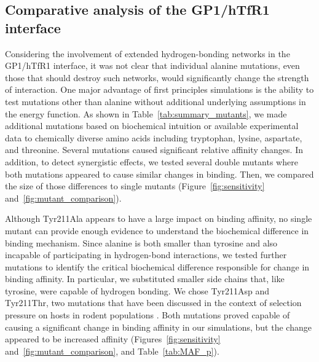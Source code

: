 \documentclass[12pt]{article}
\begin{document}
\subsection{Comparative analysis of the GP1/hTfR1 interface}
Considering the involvement of extended hydrogen-bonding networks in the GP1/hTfR1 interface, it was not clear that individual alanine mutations, even those that should destroy such networks, would significantly change the strength of interaction. One major advantage of first principles simulations is the ability to test mutations other than alanine without additional underlying assumptions in the energy function. As shown in Table~\ref{tab:summary_mutants}, we made additional mutations based on biochemical intuition or available experimental data to chemically diverse amino acids including tryptophan, lysine, aspartate, and threonine. Several mutations caused significant relative affinity changes. In addition, to detect synergistic effects, we tested several double mutants where both mutations appeared to cause similar changes in binding. Then, we compared the size of those differences to single mutants (Figure~\ref{fig:sensitivity} and~\ref{fig:mutant_comparison}).

Although Tyr211Ala appears to have a large impact on binding affinity, no single mutant can provide enough evidence to understand the biochemical difference in binding mechanism. Since alanine is both smaller than tyrosine and also incapable of participating in hydrogen-bond interactions, we tested further mutations to identify the critical biochemical difference responsible for change in binding affinity. In particular, we substituted smaller side chains that, like tyrosine, were capable of hydrogen bonding. We chose Tyr211Asp and Tyr211Thr, two mutations that have been discussed in the context of selection pressure on hosts in rodent populations \citep{Rad2008,Rad20111,Rad20112}. Both mutations proved capable of causing a significant change in binding affinity in our simulations, but the change appeared to be increased affinity (Figures~\ref{fig:sensitivity} and~\ref{fig:mutant_comparison}, and Table~\ref{tab:MAF_p}).
\end{document}
